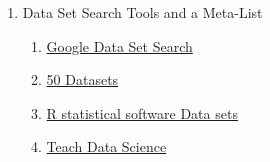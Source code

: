 \documentclass[11pt]{article}
\begin{document}
\begin{enumerate}
\begin{enumerate}
\end{enumerate}
\item Data Set Search Tools and a Meta-List
\begin{enumerate}
\item \href{https://datasetsearch.research.google.com/}{Google Data Set Search}
\item \href{https://blog.journeyofanalytics.com/50-free-datasets-for-data-science-projects/}{50 Datasets}
\item \href{https://r-dir.com/reference/datasets.html}{R statistical software Data sets}
\item \href{https://teachdatascience.com/datasources/}{Teach Data Science}
\end{enumerate}

\end{enumerate}
\end{document}
